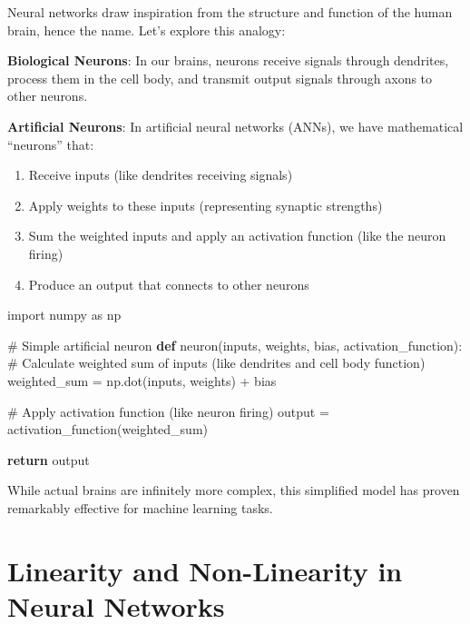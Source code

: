 \documentclass[
  letterpaper,
  DIV=11,
  numbers=noendperiod]{scrreprt}
\newenvironment{Shaded}{\begin{snugshade}}{\end{snugshade}}
\newcommand{\CommentTok}[1]{\textcolor[rgb]{0.37,0.37,0.37}{#1}}
\newcommand{\ControlFlowTok}[1]{\textcolor[rgb]{0.00,0.23,0.31}{\textbf{#1}}}
\newcommand{\ImportTok}[1]{\textcolor[rgb]{0.00,0.46,0.62}{#1}}
\newcommand{\KeywordTok}[1]{\textcolor[rgb]{0.00,0.23,0.31}{\textbf{#1}}}
\newcommand{\NormalTok}[1]{\textcolor[rgb]{0.00,0.23,0.31}{#1}}
\newcommand{\OperatorTok}[1]{\textcolor[rgb]{0.37,0.37,0.37}{#1}}
\providecommand{\tightlist}{%
  \setlength{\itemsep}{0pt}\setlength{\parskip}{0pt}}\usepackage{longtable,booktabs,array}
\begin{document}
Neural networks draw inspiration from the structure and function of the
human brain, hence the name. Let's explore this analogy:

\textbf{Biological Neurons}: In our brains, neurons receive signals
through dendrites, process them in the cell body, and transmit output
signals through axons to other neurons.

\textbf{Artificial Neurons}: In artificial neural networks (ANNs), we
have mathematical ``neurons'' that:

\begin{enumerate}
\def\labelenumi{\arabic{enumi}.}
\tightlist
\item
  Receive inputs (like dendrites receiving signals)
\item
  Apply weights to these inputs (representing synaptic strengths)
\item
  Sum the weighted inputs and apply an activation function (like the
  neuron firing)
\item
  Produce an output that connects to other neurons
\end{enumerate}

\begin{Shaded}
\begin{Highlighting}[]
\ImportTok{import}\NormalTok{ numpy }\ImportTok{as}\NormalTok{ np}

\CommentTok{\# Simple artificial neuron}
\KeywordTok{def}\NormalTok{ neuron(inputs, weights, bias, activation\_function):}
    \CommentTok{\# Calculate weighted sum of inputs (like dendrites and cell body function)}
\NormalTok{    weighted\_sum }\OperatorTok{=}\NormalTok{ np.dot(inputs, weights) }\OperatorTok{+}\NormalTok{ bias}
    
    \CommentTok{\# Apply activation function (like neuron firing)}
\NormalTok{    output }\OperatorTok{=}\NormalTok{ activation\_function(weighted\_sum)}
    
    \ControlFlowTok{return}\NormalTok{ output}
\end{Highlighting}
\end{Shaded}

While actual brains are infinitely more complex, this simplified model
has proven remarkably effective for machine learning tasks.

\section{Linearity and Non-Linearity in Neural
Networks}\label{linearity-and-non-linearity-in-neural-networks}
\end{document}
